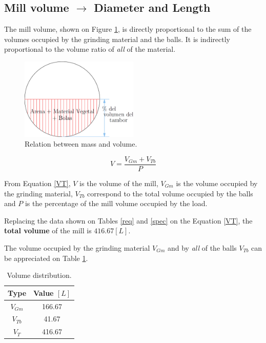 \subsection{Mill volume $\rightarrow$ Diameter and Length}

The mill volume, shown on Figure \ref{volume}, is directly proportional to the sum of the volumes occupied by the grinding material and the balls. It is indirectly proportional to the volume ratio of \textit{all} of the material.

\begin{figure}[H]
\centering
\includegraphics[width=0.5\textwidth]{Images/Preprocesamiento/volumen.PNG}
\caption{Relation between mass and volume.}
\label{volume}
\end{figure}

\begin{equation}
V = \frac{V_{Gm} + V_{Tb}}{P}
\label{VT}
\end{equation}

From Equation \ref{VT}, $V$ is the volume of the mill, $V_{Gm}$ is the volume occupied by the grinding material, $V_{Tb}$ correspond to the total volume occupied by the balls and $P$ is the percentage of the mill volume occupied by the load.

\vspace{.5em}

Replacing the data shown on Tables \ref{req} and \ref{spec} on the Equation \ref{VT}, the \textbf{total volume} of the mill is $416.67 [L]$.

\vspace{.5em}

The volume occupied by the grinding material $V_{Gm}$ and by \textit{all} of the balls $V_{Tb}$ can be appreciated on Table \ref{volumes}.

\begin{table}[H]
\centering
\begin{tabular}{cc}
\hline
\textbf{Type} & \textbf{Value $[L]$} \\ \hline \hline
$V_{Gm}$ & 166.67 \\
$V_{Tb}$ & 41.67 \\
$V_{T}$ & 416.67 \\ \hline
\end{tabular}
\caption{Volume distribution.}
\label{volumes}
\end{table}


